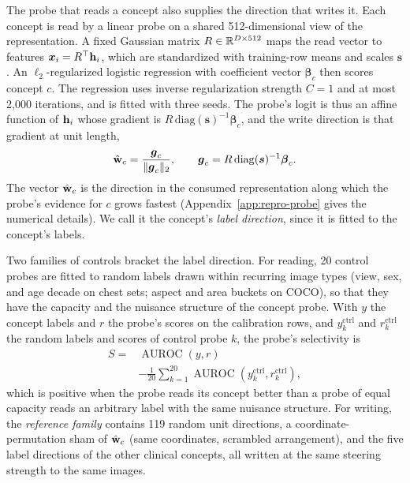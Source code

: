\documentclass[11pt]{article}
\begin{document}
The probe that reads a concept also supplies the direction that writes it. Each concept is read by a linear probe on a shared 512-dimensional view of the representation. A fixed Gaussian matrix $R\in\mathbb{R}^{D\times512}$ maps the read vector to features $\boldsymbol x_i=R^{\top}\mathbf{h}_i$, which are standardized with training-row means and scales $\boldsymbol s$. An $\ell_2$-regularized logistic regression with coefficient vector $\boldsymbol\beta_c$ then scores concept $c$. The regression uses inverse regularization strength $C=1$ and at most 2{,}000 iterations, and is fitted with three seeds. The probe's logit is thus an affine function of $\mathbf{h}_i$ whose gradient is $R\,\mathrm{diag}(\boldsymbol s)^{-1}\boldsymbol\beta_c$, and the write direction is that gradient at unit length,
\begin{equation}
\hat{\mathbf{w}}_c=\frac{\boldsymbol g_c}{\lVert\boldsymbol g_c\rVert_2},\qquad \boldsymbol g_c=R\,\mathrm{diag}(\boldsymbol s)^{-1}\boldsymbol\beta_c .
\label{eq:lift}
\end{equation}
The vector $\hat{\mathbf{w}}_c$ is the direction in the consumed representation along which the probe's evidence for $c$ grows fastest (Appendix~\ref{app:repro-probe} gives the numerical details). We call it the concept's \emph{label direction}, since it is fitted to the concept's labels.

Two families of controls bracket the label direction. For reading, 20 control probes are fitted to random labels drawn within recurring image types (view, sex, and age decade on chest sets; aspect and area buckets on COCO), so that they have the capacity and the nuisance structure of the concept probe. With $y$ the concept labels and $r$ the probe's scores on the calibration rows, and $y^{\mathrm{ctrl}}_k$ and $r^{\mathrm{ctrl}}_k$ the random labels and scores of control probe $k$, the probe's selectivity is
\begin{equation}
\begin{aligned}
S={}&\operatorname{AUROC}(y,r)\\
&-\tfrac{1}{20}\textstyle\sum_{k=1}^{20}\operatorname{AUROC}(y^{\mathrm{ctrl}}_k,r^{\mathrm{ctrl}}_k),
\end{aligned}
\label{eq:selectivity}
\end{equation}
which is positive when the probe reads its concept better than a probe of equal capacity reads an arbitrary label with the same nuisance structure. For writing, the \emph{reference family} contains 119 random unit directions, a coordinate-permutation sham of $\hat{\mathbf{w}}_c$ (same coordinates, scrambled arrangement), and the five label directions of the other clinical concepts, all written at the same steering strength to the same images.
\end{document}
